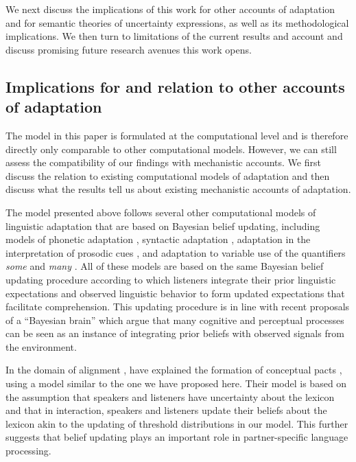 \documentclass[man, floatsintext]{apa6}
\newcommand{\jd}[1]{\textcolor{PinkyPurple}{\textbf{[jd: #1]}}}
\begin{document}
We next discuss the implications of this work for other accounts of adaptation and for semantic theories of uncertainty expressions, as well as its methodological implications. We then turn to limitations of the current results and account and discuss promising future research avenues this work opens. 



\subsection{Implications for and relation to other accounts of adaptation}

The model in this paper is formulated at the computational level \parencite{Marr1982,Anderson1990} 
and is therefore directly only comparable to other computational models. However, we can still assess 
the compatibility of our findings with mechanistic accounts. We first discuss the relation to existing computational 
models of adaptation and then discuss what the results tell us about existing mechanistic accounts of
 adaptation.

The model presented above follows several other computational models of linguistic adaptation that are based 
on Bayesian belief updating, including models of phonetic adaptation \parencite{Kleinschmidt2015}, syntactic 
adaptation \parencite{Kleinschmidt2012}, adaptation in the interpretation of prosodic cues \parencite{Roettger2019},
and adaptation to variable use of the quantifiers \textit{some} and \textit{many} \parencite{Qing2014}. 
All of these models are based on the same Bayesian belief updating procedure according to which listeners integrate
their prior linguistic expectations and observed linguistic behavior to form updated expectations that facilitate comprehension.
This updating procedure is in line with recent proposals of a ``Bayesian brain'' \parencite[e.g.,][]{Clark2013,Friston2010} which argue that
many cognitive and perceptual processes can be seen as an instance of integrating prior beliefs with observed signals from the environment.


In the domain of alignment \parencite{Pickering2004}, 
\textcite{Hawkins2017} have explained the formation of conceptual pacts \parencite{Clark1986},
 using a model  similar to the one we have proposed here. 
Their model is based on the assumption that speakers and listeners have uncertainty 
about the lexicon \parencite[see also][]{Bergen2016} and that in interaction, speakers 
and listeners update their beliefs about the lexicon akin to the updating of threshold distributions 
in our model. %
This further suggests that belief updating plays an important role in partner-specific language processing.
\end{document}
